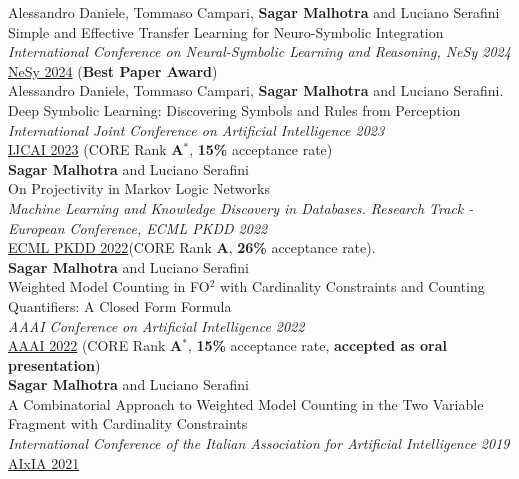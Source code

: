\documentclass[10pt, a4paper]{article}
\newcommand{\years}[1]{\marginnote{\scriptsize #1}}
\begin{document}
\years{2024}Alessandro Daniele, Tommaso Campari, \textbf{Sagar Malhotra} and Luciano Serafini\\
Simple and Effective Transfer Learning for Neuro-Symbolic Integration\\
\emph{International Conference on Neural-Symbolic Learning and Reasoning, NeSy 2024}\\
\href{https://arxiv.org/abs/2402.14047}{NeSy 2024} (\textbf{Best Paper Award})\\ 

\years{2023}Alessandro Daniele, Tommaso Campari, \textbf{Sagar Malhotra} and Luciano Serafini. \\ Deep Symbolic Learning: Discovering Symbols and Rules from Perception \\ 
\emph{International Joint Conference on Artificial Intelligence 2023}\\
\href{https://www.ijcai.org/proceedings/2023/400}{IJCAI 2023} (CORE Rank \textbf{A$^{*}$}, \textbf{15\%} acceptance rate)\\ 


\years{2022}\textbf{Sagar Malhotra} and Luciano Serafini\\
 On Projectivity in Markov Logic Networks \\ \emph{Machine Learning and Knowledge Discovery in Databases. Research Track - European Conference, ECML PKDD 2022} \\  
\href{https://link.springer.com/chapter/10.1007/978-3-031-26419-1_14}{ECML PKDD 2022}(CORE Rank \textbf{A}, \textbf{26\%} acceptance rate).\\ 

\years{2022}\textbf{Sagar Malhotra} and Luciano Serafini\\ 
Weighted Model Counting in FO$^2$ with Cardinality Constraints and Counting Quantifiers: A Closed Form Formula \\ \emph{AAAI Conference on Artificial Intelligence 2022}\\
\href{https://ojs.aaai.org/index.php/AAAI/article/view/20525}{AAAI 2022} (CORE Rank \textbf{A$^{*}$}, \textbf{15\%} acceptance rate, \textbf{accepted as oral presentation}) \\

\years{2021}\textbf{Sagar Malhotra} and Luciano Serafini\\
 A Combinatorial Approach to Weighted Model Counting in the Two Variable Fragment with Cardinality Constraints\\ \emph{International Conference of the Italian Association for Artificial Intelligence 2019}\\
\href{https://link.springer.com/chapter/10.1007/978-3-031-08421-8_10}{AIxIA 2021}
\end{document}
